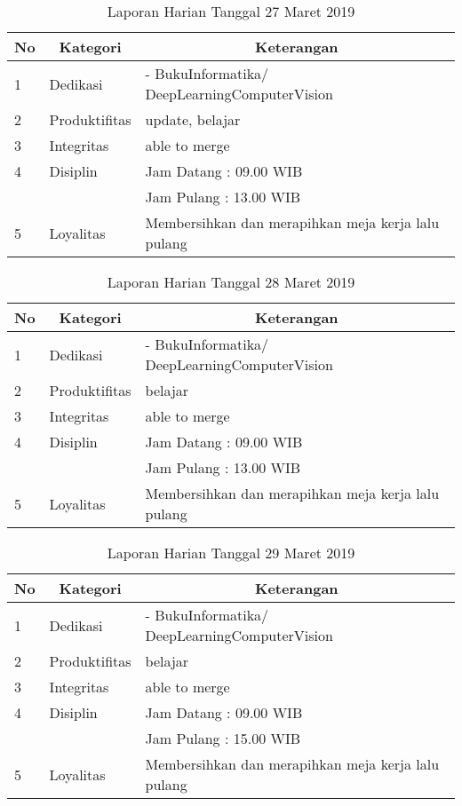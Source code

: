 \begin{table}[htp]
\caption{Laporan Harian Tanggal 27 Maret 2019}
\label{tab:lh270319}
\begin{tabular}{|l|l|l|}
\hline
\textbf{No} & \multicolumn{1}{c|}{\textbf{Kategori}} & \multicolumn{1}{c|}{\textbf{Keterangan}} \\ \hline
1 & Dedikasi & - BukuInformatika/ DeepLearningComputerVision \\ \hline
2 & Produktifitas & update, belajar  \\
3 & Integritas & able to merge \\ \hline
4 & Disiplin & Jam Datang : 09.00 WIB \\
 &  & Jam Pulang : 13.00 WIB \\ \hline
5 & Loyalitas & Membersihkan dan merapihkan meja kerja lalu pulang  \\ \hline
\end{tabular}
\end{table}

\begin{table}[htp]
\caption{Laporan Harian Tanggal 28 Maret 2019}
\label{tab:lh280319}
\begin{tabular}{|l|l|l|}
\hline
\textbf{No} & \multicolumn{1}{c|}{\textbf{Kategori}} & \multicolumn{1}{c|}{\textbf{Keterangan}} \\ \hline
1 & Dedikasi & - BukuInformatika/ DeepLearningComputerVision \\ \hline
2 & Produktifitas & belajar  \\
3 & Integritas & able to merge \\ \hline
4 & Disiplin & Jam Datang : 09.00 WIB \\
 &  & Jam Pulang : 13.00 WIB \\ \hline
5 & Loyalitas & Membersihkan dan merapihkan meja kerja lalu pulang  \\ \hline
\end{tabular}
\end{table}

\begin{table}[htp]
\caption{Laporan Harian Tanggal 29 Maret 2019}
\label{tab:lh290319}
\begin{tabular}{|l|l|l|}
\hline
\textbf{No} & \multicolumn{1}{c|}{\textbf{Kategori}} & \multicolumn{1}{c|}{\textbf{Keterangan}} \\ \hline
1 & Dedikasi & - BukuInformatika/ DeepLearningComputerVision \\ \hline
2 & Produktifitas & belajar  \\
3 & Integritas & able to merge \\ \hline
4 & Disiplin & Jam Datang : 09.00 WIB \\
 &  & Jam Pulang : 15.00 WIB \\ \hline
5 & Loyalitas & Membersihkan dan merapihkan meja kerja lalu pulang  \\ \hline
\end{tabular}
\end{table}